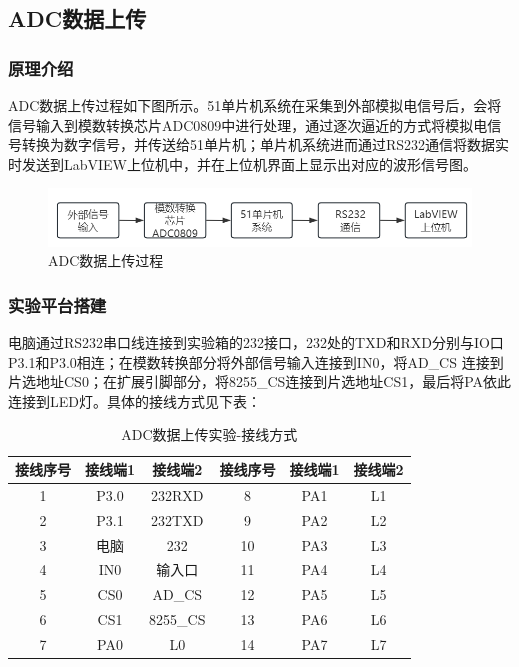 \documentclass[UTF8]{article}
\begin{document}
\subsection{ADC数据上传}
\subsubsection{原理介绍}
ADC数据上传过程如下图所示。51单片机系统在采集到外部模拟电信号后，会将信号输入到模数转换芯片ADC0809中进行处理，通过逐次逼近的方式将模拟电信号转换为数字信号，并传送给51单片机；单片机系统进而通过RS232通信将数据实时发送到LabVIEW上位机中，并在上位机界面上显示出对应的波形信号图。
\begin{figure}[H]
    \centering %
    \includegraphics[width=.8\textwidth]{figure/ADC数据上传.png} 
    \caption{ADC数据上传过程} %
\end{figure}

\subsubsection{实验平台搭建}
电脑通过RS232串口线连接到实验箱的232接口，232处的TXD和RXD分别与IO口P3.1和P3.0相连；在模数转换部分将外部信号输入连接到IN0，将AD\_CS 连接到片选地址CS0；在扩展引脚部分，将8255\_CS连接到片选地址CS1，最后将PA依此连接到LED灯。具体的接线方式见下表：
\begin{table}[H] %
\centering %
\begin{tabular}{cccccc} %
	\toprule %
	接线序号 & 接线端1 & 接线端2 & 接线序号 & 接线端1 & 接线端2 \\
	\midrule %
	1 & P3.0 & 232RXD & 8 & PA1 & L1 \\
	2 & P3.1 & 232TXD & 9 & PA2 & L2 \\
	3 & 电脑 & 232 & 10 & PA3 & L3 \\
	4 & IN0 & 输入口 & 11 & PA4 & L4 \\
	5 & CS0 & AD\_CS & 12 & PA5 & L5 \\
	6 & CS1 & 8255\_CS & 13 & PA6 & L6 \\
	7 & PA0 & L0 & 14 & PA7 & L7 \\
	\bottomrule %
\end{tabular}
\caption{ADC数据上传实验-接线方式} %
\end{table}
\end{document}
